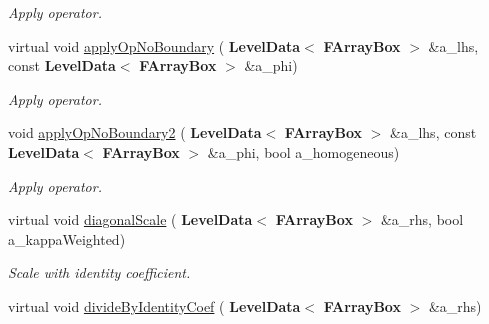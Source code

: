 \begin{Indent}
\begin{DoxyCompactItemize}
\begin{DoxyCompactList}\small\item\em Apply operator. \end{DoxyCompactList}\item 
\mbox{\label{class_a_m_r_non_linear_multi_comp_op_aa6b8a71fa8501fdb71adab30bc7d5295}} 
virtual void \hyperlink{class_a_m_r_non_linear_multi_comp_op_aa6b8a71fa8501fdb71adab30bc7d5295}{apply\+Op\+No\+Boundary} (\textbf{ Level\+Data}$<$ \textbf{ F\+Array\+Box} $>$ \&a\+\_\+lhs, const \textbf{ Level\+Data}$<$ \textbf{ F\+Array\+Box} $>$ \&a\+\_\+phi)
\begin{DoxyCompactList}\small\item\em Apply operator. \end{DoxyCompactList}\item 
\mbox{\label{class_a_m_r_non_linear_multi_comp_op_a2dba9dd175512b57ac8e2a7d88a0d79c}} 
void \hyperlink{class_a_m_r_non_linear_multi_comp_op_a2dba9dd175512b57ac8e2a7d88a0d79c}{apply\+Op\+No\+Boundary2} (\textbf{ Level\+Data}$<$ \textbf{ F\+Array\+Box} $>$ \&a\+\_\+lhs, const \textbf{ Level\+Data}$<$ \textbf{ F\+Array\+Box} $>$ \&a\+\_\+phi, bool a\+\_\+homogeneous)
\begin{DoxyCompactList}\small\item\em Apply operator. \end{DoxyCompactList}\item 
\mbox{\label{class_a_m_r_non_linear_multi_comp_op_a8febdc5604ebbaabbbb09832fe829a24}} 
virtual void \hyperlink{class_a_m_r_non_linear_multi_comp_op_a8febdc5604ebbaabbbb09832fe829a24}{diagonal\+Scale} (\textbf{ Level\+Data}$<$ \textbf{ F\+Array\+Box} $>$ \&a\+\_\+rhs, bool a\+\_\+kappa\+Weighted)
\begin{DoxyCompactList}\small\item\em Scale with identity coefficient. \end{DoxyCompactList}\item 
\mbox{\label{class_a_m_r_non_linear_multi_comp_op_a9b8f70f0355ad8fe044d132d5235b50d}} 
virtual void \hyperlink{class_a_m_r_non_linear_multi_comp_op_a9b8f70f0355ad8fe044d132d5235b50d}{divide\+By\+Identity\+Coef} (\textbf{ Level\+Data}$<$ \textbf{ F\+Array\+Box} $>$ \&a\+\_\+rhs)

\end{DoxyCompactItemize}
\end{Indent}
